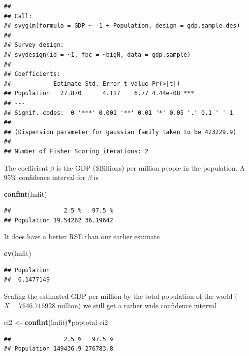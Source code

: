 \documentclass[
]{book}
\newenvironment{Shaded}{\begin{snugshade}}{\end{snugshade}}
\newcommand{\FunctionTok}[1]{\textcolor[rgb]{0.13,0.29,0.53}{\textbf{#1}}}
\newcommand{\NormalTok}[1]{#1}
\newcommand{\OtherTok}[1]{\textcolor[rgb]{0.56,0.35,0.01}{#1}}
\newcommand{\SpecialCharTok}[1]{\textcolor[rgb]{0.81,0.36,0.00}{\textbf{#1}}}
\begin{document}
\begin{verbatim}
## 
## Call:
## svyglm(formula = GDP ~ -1 + Population, design = gdp.sample.des)
## 
## Survey design:
## svydesign(id = ~1, fpc = ~bigN, data = gdp.sample)
## 
## Coefficients:
##            Estimate Std. Error t value Pr(>|t|)    
## Population   27.870      4.117    6.77 4.44e-08 ***
## ---
## Signif. codes:  0 '***' 0.001 '**' 0.01 '*' 0.05 '.' 0.1 ' ' 1
## 
## (Dispersion parameter for gaussian family taken to be 423229.9)
## 
## Number of Fisher Scoring iterations: 2
\end{verbatim}

The coefficient \(\beta\) is the GDP (\$Billions) per million people in the population.
A 95\% confidence interval for \(\beta\) is

\begin{Shaded}
\begin{Highlighting}[]
\FunctionTok{confint}\NormalTok{(lmfit)}
\end{Highlighting}
\end{Shaded}

\begin{verbatim}
##               2.5 %   97.5 %
## Population 19.54262 36.19642
\end{verbatim}

It does have a better RSE than our earlier estimate

\begin{Shaded}
\begin{Highlighting}[]
\FunctionTok{cv}\NormalTok{(lmfit)}
\end{Highlighting}
\end{Shaded}

\begin{verbatim}
## Population 
##  0.1477149
\end{verbatim}

Scaling the estimated GDP per million by the total population of the world (\(X=7646.716928\) million) we
still get a rather wide confidence interval

\begin{Shaded}
\begin{Highlighting}[]
\NormalTok{ci2 }\OtherTok{\textless{}{-}} \FunctionTok{confint}\NormalTok{(lmfit)}\SpecialCharTok{*}\NormalTok{poptotal}
\NormalTok{ci2}
\end{Highlighting}
\end{Shaded}

\begin{verbatim}
##               2.5 %   97.5 %
## Population 149436.9 276783.8
\end{verbatim}
\end{document}
